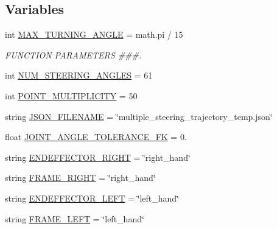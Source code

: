 \subsection*{Variables}
\begin{DoxyCompactItemize}
\item 
int \mbox{\hyperlink{namespacesteering__capture__multiple__trajectories_a40863367d4da7da82fb534541b8a29ad}{M\+A\+X\+\_\+\+T\+U\+R\+N\+I\+N\+G\+\_\+\+A\+N\+G\+LE}} = math.\+pi / 15
\begin{DoxyCompactList}\small\item\em F\+U\+N\+C\+T\+I\+ON P\+A\+R\+A\+M\+E\+T\+E\+RS \#\#\#. \end{DoxyCompactList}\item 
int \mbox{\hyperlink{namespacesteering__capture__multiple__trajectories_a2372127a1b9025d7a508ed838ada6fba}{N\+U\+M\+\_\+\+S\+T\+E\+E\+R\+I\+N\+G\+\_\+\+A\+N\+G\+L\+ES}} = 61
\item 
int \mbox{\hyperlink{namespacesteering__capture__multiple__trajectories_aff39cf6ffe3629f0c7e774ed14bc94cf}{P\+O\+I\+N\+T\+\_\+\+M\+U\+L\+T\+I\+P\+L\+I\+C\+I\+TY}} = 50
\item 
string \mbox{\hyperlink{namespacesteering__capture__multiple__trajectories_a5b90d04415dda9cfbca0f7cbcc8e360e}{J\+S\+O\+N\+\_\+\+F\+I\+L\+E\+N\+A\+ME}} = \char`\"{}multiple\+\_\+steering\+\_\+trajectory\+\_\+temp.\+json\char`\"{}
\item 
float \mbox{\hyperlink{namespacesteering__capture__multiple__trajectories_a72cf7e53c4678321817b70570842582b}{J\+O\+I\+N\+T\+\_\+\+A\+N\+G\+L\+E\+\_\+\+T\+O\+L\+E\+R\+A\+N\+C\+E\+\_\+\+FK}} = 0.
\item 
string \mbox{\hyperlink{namespacesteering__capture__multiple__trajectories_ad2a5ba548c1d8b15b33e7c0c6f5f7774}{E\+N\+D\+E\+F\+F\+E\+C\+T\+O\+R\+\_\+\+R\+I\+G\+HT}} = \char`\"{}right\+\_\+hand\char`\"{}
\item 
string \mbox{\hyperlink{namespacesteering__capture__multiple__trajectories_a3bfc9a7fa847955d6d833a7745063fe5}{F\+R\+A\+M\+E\+\_\+\+R\+I\+G\+HT}} = \char`\"{}right\+\_\+hand\char`\"{}
\item 
string \mbox{\hyperlink{namespacesteering__capture__multiple__trajectories_ac4f49abb136b76ccf6ae5ff9132c9307}{E\+N\+D\+E\+F\+F\+E\+C\+T\+O\+R\+\_\+\+L\+E\+FT}} = \char`\"{}left\+\_\+hand\char`\"{}
\item 
string \mbox{\hyperlink{namespacesteering__capture__multiple__trajectories_a704345f9f3718283855612cc31adca4f}{F\+R\+A\+M\+E\+\_\+\+L\+E\+FT}} = \char`\"{}left\+\_\+hand\char`\"{}

\end{DoxyCompactItemize}
